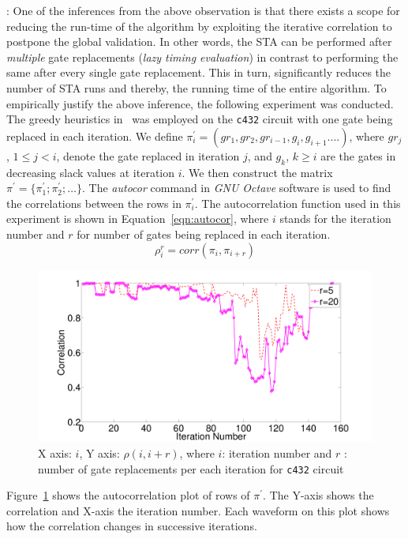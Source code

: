 \noindent {}: One of the inferences from the above observation is that there exists a scope for reducing the run-time of the algorithm by exploiting the iterative correlation to postpone the global validation. In other words, the STA can be performed  after {\it multiple} gate replacements ({\it lazy timing evaluation}) in contrast to performing the same after every single gate replacement. This in turn,  significantly reduces the number of STA runs and thereby, the running time of the entire algorithm. To empirically justify the above inference, the following experiment was conducted. The greedy heuristics in~\cite{mok:12} was employed on the \texttt{c432} circuit with one gate being replaced in each iteration. We define $\pi^{'}_i = (gr_1, gr_2, gr_{i-1}, g_i, g_{i+1} ....)$, where 
$gr_j$, $1 \leq j < i$, denote the gate replaced in iteration $j$, and $g_k$, $k \geq i$ are the gates in decreasing slack values at iteration $i$.  
We then construct the matrix $\pi^{'} = \{\pi_1^{'}; \pi_2^{'}; \dots\}$. The {\it autocor} command in {\it GNU Octave} software is used to find the correlations between the rows in $\pi_i^{'}$. The autocorrelation function used in this experiment is shown in Equation~\ref{eqn:autocor}, 
where $i$ stands for the iteration number and $r$ for number of gates being replaced in each iteration.
\begin{equation} \label{eqn:autocor} \rho_{i}^{r} = corr(\pi_i,\pi_{i+r}) \end{equation}

\begin{figure}[!t]
\begin{center}
\includegraphics[scale=0.2]{Chapter3/fig/c432_correlation_between_ordering_replacements_with_throwngates.pdf}
\caption{X axis: $i$, Y axis: $\rho(i,i+r)$, where $i$: iteration number and $r$ : number of gate replacements per each iteration for 
\texttt{c432} circuit}
\label{fig:c432-corr}
\end{center}
\end{figure}
\noindent Figure~\ref{fig:c432-corr}
shows the autocorrelation plot of rows of $\pi^{'}$.
The Y-axis shows the correlation and X-axis the iteration number.
Each waveform on this plot shows how the correlation changes in successive iterations.

